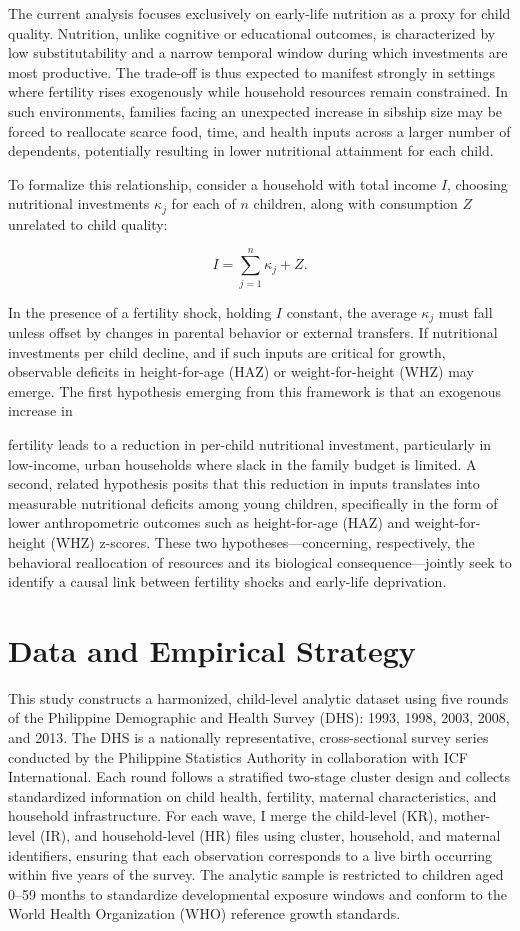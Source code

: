 \documentclass[]{AEA}
\begin{document}
The current analysis focuses exclusively on early-life nutrition as a
proxy for child quality. Nutrition, unlike cognitive or educational
outcomes, is characterized by low substitutability and a narrow temporal
window during which investments are most productive. The trade-off is
thus expected to manifest strongly in settings where fertility rises
exogenously while household resources remain constrained. In such
environments, families facing an unexpected increase in sibship size may
be forced to reallocate scarce food, time, and health inputs across a
larger number of dependents, potentially resulting in lower nutritional
attainment for each child.

To formalize this relationship, consider a household with total income
\(I\), choosing nutritional investments \(\kappa_j\) for each of \(n\)
children, along with consumption \(Z\) unrelated to child quality:

\[
I = \sum_{j=1}^{n} \kappa_j + Z.
\]

In the presence of a fertility shock, holding \(I\) constant, the
average \(\kappa_j\) must fall unless offset by changes in parental
behavior or external transfers. If nutritional investments per child
decline, and if such inputs are critical for growth, observable deficits
in height-for-age (HAZ) or weight-for-height (WHZ) may emerge. The first
hypothesis emerging from this framework is that an exogenous increase in

fertility leads to a reduction in per-child nutritional investment,
particularly in low-income, urban households where slack in the family
budget is limited. A second, related hypothesis posits that this
reduction in inputs translates into measurable nutritional deficits
among young children, specifically in the form of lower anthropometric
outcomes such as height-for-age (HAZ) and weight-for-height (WHZ)
z-scores. These two hypotheses---concerning, respectively, the
behavioral reallocation of resources and its biological
consequence---jointly seek to identify a causal link between fertility
shocks and early-life deprivation.

\section{Data and Empirical Strategy}

This study constructs a harmonized, child-level analytic dataset using
five rounds of the Philippine Demographic and Health Survey (DHS): 1993,
1998, 2003, 2008, and 2013. The DHS is a nationally representative,
cross-sectional survey series conducted by the Philippine Statistics
Authority in collaboration with ICF International. Each round follows a
stratified two-stage cluster design and collects standardized
information on child health, fertility, maternal characteristics, and
household infrastructure. For each wave, I merge the child-level (KR),
mother-level (IR), and household-level (HR) files using cluster,
household, and maternal identifiers, ensuring that each observation
corresponds to a live birth occurring within five years of the survey.
The analytic sample is restricted to children aged 0--59 months to
standardize developmental exposure windows and conform to the World
Health Organization (WHO) reference growth standards.
\end{document}
